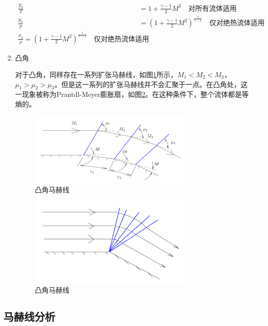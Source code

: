 \begin{enumerate}
    \begin{align*}
        \frac{T_{0}}{T}&=1+\frac{\gamma-1}{2} M^{2}\quad\mbox{对所有流体适用}\\ 
        \frac{p_{0}}{p}&=\left(1+\frac{\gamma-1}{2} M^{2}\right)^{\frac{\gamma}{\gamma-1}}\quad\mbox{仅对绝热流体适用}\\ 
        \frac{\rho_{0}}{\rho}=\left(1+\frac{\gamma-1}{2} M^{2}\right)^{\frac{1}{\gamma-1}}\quad\mbox{仅对绝热流体适用}
    \end{align*}

    \item 凸角
    
    对于凸角，同样存在一系列扩张马赫线，如图\ref{12}所示，$M_1<M_2<M_3$，$\mu_1>\mu_2>\mu_3$。但是这一系列的扩张马赫线并不会汇聚于一点。在凸角处，这一现象被称为Prantdl-Meyer膨胀扇，如图\ref{13}。在这种条件下，整个流体都是等熵的。


    \begin{figure}[!ht]
        \centering
        \includegraphics[width=8cm]{figures/12.png}
        \caption{凸角马赫线}
        \label{12}
    \end{figure}

    
    \begin{figure}[!ht]
        \centering
        \includegraphics[width=8cm]{figures/13.png}
        \caption{凸角马赫线}
        \label{13}
    \end{figure}
\end{enumerate}

\subsection{马赫线分析}

